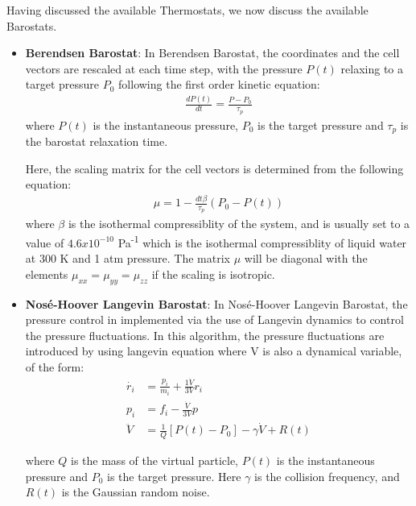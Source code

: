     Having discussed the available Thermostats, we now discuss the available Barostats.
    \begin{itemize}
        \item \textbf{Berendsen Barostat}\supercite{berendsen_molecular_1984}: In Berendsen Barostat, the coordinates and the cell vectors are rescaled at each time step, with the pressure $P(t)$ relaxing to a target pressure $P_0$ following the first order kinetic equation:
        \begin{align*}
            \frac{dP(t)}{dt} = \frac{P-P_0}{\tau_p}
        \end{align*}
        where $P(t)$ is the instantaneous pressure, $P_0$ is the target pressure and $\tau_p$ is the barostat relaxation time. 

        Here, the scaling matrix for the cell vectors is determined from the following equation:
        \begin{align*}
            \mu = 1 - \frac{dt\beta}{\tau_p}\left(P_0 - P(t)\right)
        \end{align*}
        where $\beta$ is the isothermal compressiblity of the system, and is usually set to a value of $4.6x10^{-10}$ Pa\textsuperscript{-1} which is the isothermal compressiblity of liquid water at 300 K and 1 atm pressure. The matrix $\mu$ will be diagonal with the elements $\mu_{xx} = \mu_{yy} = \mu_{zz}$ if the scaling is isotropic.

        \item \textbf{Nos\'{e}-Hoover Langevin Barostat}\supercite{feller_constant_1995,martyna_constant_1994}: In Nos\'{e}-Hoover Langevin Barostat, the pressure control in implemented via the use of Langevin dynamics to control the pressure fluctuations. In this algorithm, the pressure fluctuations are introduced by using langevin equation where V is also a dynamical variable, of the form:
        \begin{align*}
            \dot{r_i} &= \frac{p_i}{m_i} + \frac{1\dot{V}}{3V}r_i \\
            p_i &= f_i - \frac{\dot{V}}{3V}p \\
            \ddot{V} &= \frac{1}{Q}\left[P(t)-P_0\right]-\gamma\dot{V} + R(t)
        \end{align*}

        where $Q$ is the mass of the virtual particle, $P(t)$ is the instantaneous pressure and $P_0$ is the target pressure. Here $\gamma$ is the collision frequency, and $R(t)$ is the Gaussian random noise.
    \end{itemize}


